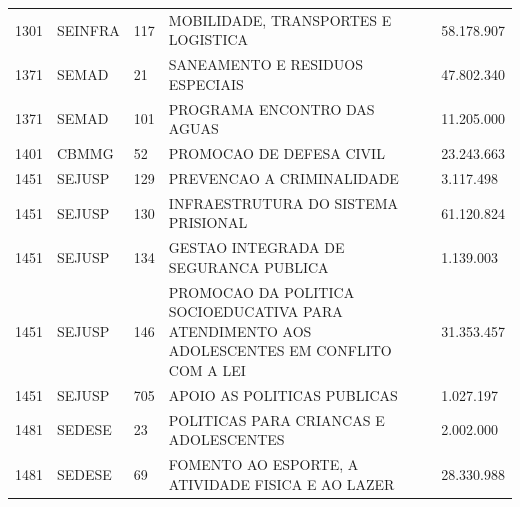 \documentclass{article}
\begin{document}
\begin{longtable}[c]{m{1cm}|m{1.5cm}|m{1cm}m{10cm}|m{2cm}}
\multicolumn{1}{C{1cm}|}{1301} & \multicolumn{1}{L{1.5cm}|}{SEINFRA} & \multicolumn{1}{C{1cm}|}{117} & \multicolumn{1}{L{10cm}|}{MOBILIDADE, TRANSPORTES E LOGISTICA} & \multicolumn{1}{R{2cm}}{58.178.907} \\
\multicolumn{1}{C{1cm}|}{1371} & \multicolumn{1}{L{1.5cm}|}{SEMAD} & \multicolumn{1}{C{1cm}|}{21} & \multicolumn{1}{L{10cm}|}{SANEAMENTO E RESIDUOS ESPECIAIS} & \multicolumn{1}{R{2cm}}{47.802.340} \\
\multicolumn{1}{C{1cm}|}{1371} & \multicolumn{1}{L{1.5cm}|}{SEMAD} & \multicolumn{1}{C{1cm}|}{101} & \multicolumn{1}{L{10cm}|}{PROGRAMA ENCONTRO DAS AGUAS} & \multicolumn{1}{R{2cm}}{11.205.000} \\
\multicolumn{1}{C{1cm}|}{1401} & \multicolumn{1}{L{1.5cm}|}{CBMMG} & \multicolumn{1}{C{1cm}|}{52} & \multicolumn{1}{L{10cm}|}{PROMOCAO DE DEFESA CIVIL} & \multicolumn{1}{R{2cm}}{23.243.663} \\
\multicolumn{1}{C{1cm}|}{1451} & \multicolumn{1}{L{1.5cm}|}{SEJUSP} & \multicolumn{1}{C{1cm}|}{129} & \multicolumn{1}{L{10cm}|}{PREVENCAO A CRIMINALIDADE} & \multicolumn{1}{R{2cm}}{3.117.498} \\
\multicolumn{1}{C{1cm}|}{1451} & \multicolumn{1}{L{1.5cm}|}{SEJUSP} & \multicolumn{1}{C{1cm}|}{130} & \multicolumn{1}{L{10cm}|}{INFRAESTRUTURA DO SISTEMA PRISIONAL} & \multicolumn{1}{R{2cm}}{61.120.824} \\
\multicolumn{1}{C{1cm}|}{1451} & \multicolumn{1}{L{1.5cm}|}{SEJUSP} & \multicolumn{1}{C{1cm}|}{134} & \multicolumn{1}{L{10cm}|}{GESTAO INTEGRADA DE SEGURANCA PUBLICA} & \multicolumn{1}{R{2cm}}{1.139.003} \\
\multicolumn{1}{C{1cm}|}{1451} & \multicolumn{1}{L{1.5cm}|}{SEJUSP} & \multicolumn{1}{C{1cm}|}{146} & \multicolumn{1}{L{10cm}|}{PROMOCAO DA POLITICA SOCIOEDUCATIVA PARA ATENDIMENTO AOS ADOLESCENTES EM CONFLITO COM A LEI} & \multicolumn{1}{R{2cm}}{31.353.457} \\
\multicolumn{1}{C{1cm}|}{1451} & \multicolumn{1}{L{1.5cm}|}{SEJUSP} & \multicolumn{1}{C{1cm}|}{705} & \multicolumn{1}{L{10cm}|}{APOIO AS POLITICAS PUBLICAS} & \multicolumn{1}{R{2cm}}{1.027.197} \\
\multicolumn{1}{C{1cm}|}{1481} & \multicolumn{1}{L{1.5cm}|}{SEDESE} & \multicolumn{1}{C{1cm}|}{23} & \multicolumn{1}{L{10cm}|}{POLITICAS PARA CRIANCAS E ADOLESCENTES} & \multicolumn{1}{R{2cm}}{2.002.000} \\
\multicolumn{1}{C{1cm}|}{1481} & \multicolumn{1}{L{1.5cm}|}{SEDESE} & \multicolumn{1}{C{1cm}|}{69} & \multicolumn{1}{L{10cm}|}{FOMENTO AO ESPORTE, A ATIVIDADE FISICA E AO LAZER} & \multicolumn{1}{R{2cm}}{28.330.988} \\

\end{longtable}
\end{document}
